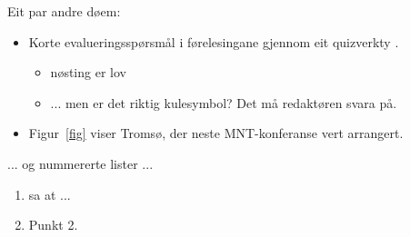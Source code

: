 \documentclass[nynorsk]{mnt}
\begin{document}
Eit par andre døem:
\begin{itemize}
  \item 
Korte evalueringsspørsmål i førelesingane gjennom eit
      quizverkty \citep{hgs2018udit}.
   \begin{itemize}
     \item nøsting er lov
     \item ... men er det riktig kulesymbol?  Det må redaktøren svara på.
   \end{itemize}
  \item 
Figur~\ref{fig} viser Tromsø, der neste MNT-konferanse vert arrangert.
\end{itemize}

... og nummererte lister ...
\begin{enumerate}
  \item 
    \cite{biggs11a} sa at ...
  \item Punkt 2.
\end{enumerate}




\end{document}

